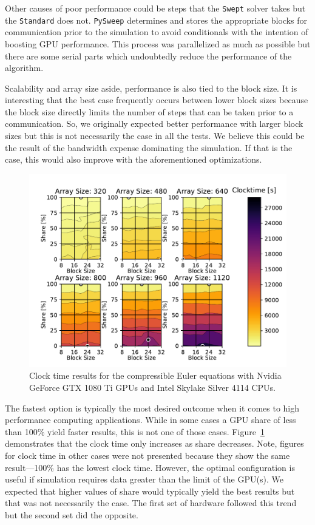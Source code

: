 \documentclass[review]{elsarticle}
\def\oldCPU{s}
\def\oldGPU{s}
\def\pysweep{\texttt{PySweep}}
\def\Swept{\texttt{Swept}}
\def\Standard{\texttt{Standard}}
\def\oldCPU{Intel Skylake Silver 4114} %
\def\oldGPU{Nvidia GeForce GTX 1080 Ti}
\begin{document}
Other causes of poor performance could be steps that the \Swept{} solver takes but the \Standard{} does not. \pysweep{} determines and stores the appropriate blocks for communication prior to the simulation to avoid conditionals with the intention of boosting GPU performance. This process was parallelized as much as possible but there are some serial parts which undoubtedly reduce the performance of the algorithm. 

Scalability and array size aside, performance is also tied to the block size. It is interesting that the best case frequently occurs between lower block sizes because the block size directly limits the number of steps that can be taken prior to a communication. So, we originally expected better performance with larger block sizes but this is not necessarily the case in all the tests. We believe this could be the result of the bandwidth expense dominating the simulation. If that is the case, this would also improve with the aforementioned optimizations.

\begin{figure}[htb!]
    \centering
    \includegraphics[scale=0.7]{figs/clockTimeSwepteulerOld.pdf}
    \caption{Clock time results  for the compressible Euler equations with \oldGPU{} GPUs and \oldCPU{} CPUs.}
    \label{fig:clocktimeOldEuler}
\end{figure}

The fastest option is typically the most desired outcome when it comes to high performance computing applications. While in some cases a GPU share of less than 100\% yield faster results, this is not one of those cases. Figure~\ref{fig:clocktimeOldEuler} demonstrates that the clock time only increases as share decreases. Note, figures for clock time in other cases were not presented because they show the same result---100\% has the lowest clock time. However, the optimal configuration is useful if simulation requires data greater than the limit of the GPU(s). We expected that higher values of share would typically yield the best results but that was not necessarily the case. The first set of hardware followed this trend but the second set did the opposite. 
\end{document}
